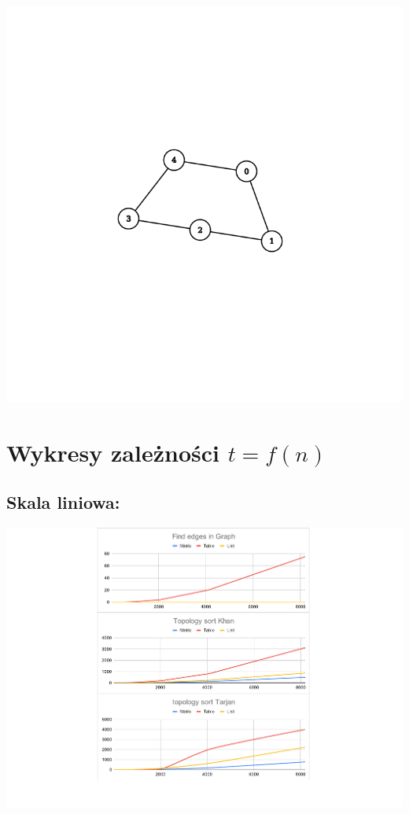 \documentclass[12pt]{article}
\begin{document}
\begin{center}
\includegraphics[scale=0.25]{graph_table.png}

\end{center}

\section{Wykresy zależności $ t = f(n) $}

\subsection{Skala liniowa: }

\begin{center}

\includegraphics[width=\linewidth]{wykresy_liniowe.pdf}

\end{center}
\end{document}
